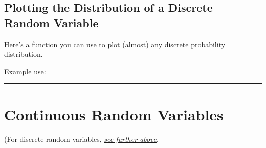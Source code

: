 \documentclass[letterpaper,10pt,english]{jupyterBook}
\begin{document}
\subsection{Plotting the Distribution of a Discrete Random Variable}
\label{\detokenize{GB213-review-in-Python:plotting-the-distribution-of-a-discrete-random-variable}}
\sphinxAtStartPar
Here’s a function you can use to plot (almost) any discrete probability distribution.

\begin{sphinxVerbatim}[commandchars=\\\{\}]
    
            
         
        
        
        
      
\end{sphinxVerbatim}

\sphinxAtStartPar
Example use:

\begin{sphinxVerbatim}[commandchars=\\\{\}]
  
\end{sphinxVerbatim}

\noindent{}


\bigskip\hrule\bigskip



\section{Continuous Random Variables}
\label{\detokenize{GB213-review-in-Python:continuous-random-variables}}
\sphinxAtStartPar
(For discrete random variables, {\hyperref[\detokenize{GB213-review-in-Python:discrete-random-variables}]{\emph{see further above}}}.
\end{document}
